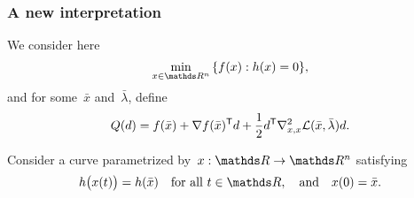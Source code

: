 \documentclass{polyu-presentation}
\newcommand{\lag}{\mathcal{L}}
\newcommand{\obj}{f}
\begin{document}
\begin{frame}
    \frametitle{A new interpretation}

    We consider here
    \begin{equation*}
        \min_{x \in \R^n} \, \set{\obj(x) : h(x) = 0},
    \end{equation*}
    and for some~$\bar{x}$ and~$\bar{\lambda}$, define
    \begin{equation*}
        Q(d) = \obj(\bar{x}) + \nabla \obj(\bar{x})^{\T} d + \frac{1}{2} d^{\T} \nabla_{x, x}^2 \lag(\bar{x}, \bar{\lambda}) d.
    \end{equation*}
    
    \begin{block}{}
        Consider a \alert{curve parametrized} by~$x : \R \to \R^n$ satisfying
        \begin{equation*}
            h\big(x(t)\big) = h(\bar{x}) \quad \text{for all~$t \in \R$}, \quad \text{and} \quad x(0) = \bar{x}.
        \end{equation*}

        \smallskip

        \begin{center}
        \end{center}
    \end{block}
\end{frame}
\end{document}
